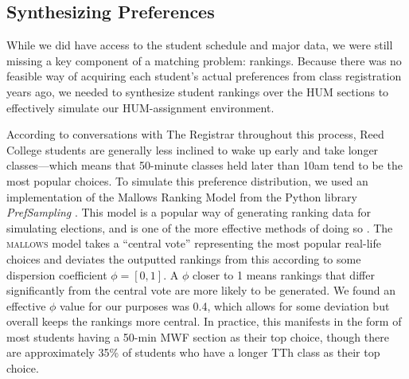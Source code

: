 \subsection{Synthesizing Preferences}

While we did have access to the student schedule and major data, we were still
missing a key component of a matching problem: rankings. Because there was no
feasible way of acquiring each student’s actual preferences from class
registration years ago, we needed to synthesize student rankings over the HUM
sections to effectively simulate our HUM-assignment environment.

According to conversations with The Registrar throughout this process, Reed
College students are generally less inclined to wake up early and take longer
classes—which means that 50-minute classes held later than 10am tend to be the
most popular choices. To simulate this preference distribution, we used an
implementation of the Mallows Ranking Model \cite{mallows} from the Python library
\textit{PrefSampling} \cite{prefsampling}. This model is a popular way of generating ranking data for
simulating elections, and is one of the more effective methods of doing so
\cite{boehmer}. The \textsc{mallows} model takes a “central vote” representing the most
popular real-life choices and deviates the outputted rankings from this
according to some dispersion coefficient $\phi = [0, 1]$. A $\phi$ closer to 1 means
rankings that differ significantly from the central vote are more likely to be
generated. We found an effective $\phi$ value for our purposes was 0.4, which allows for
some deviation but overall keeps the rankings more central. In practice, this
manifests in the form of most students having a 50-min MWF section as their top
choice, though there are approximately 35\% of students who have a longer TTh
class as their top choice.

